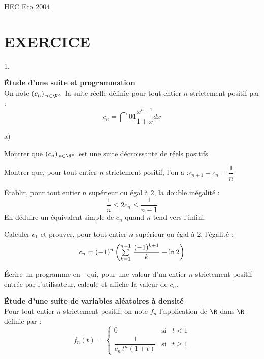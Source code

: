 \documentclass[11pt]{article}%
\begin{document}
\begin{center}
{\huge HEC Eco 2004}
\end{center}


\section*{EXERCICE}

\begin{noliste}{1.}
 \setlength{\itemsep}{4mm}
\item \textbf{Étude d'une suite et programmation}\\
On note $(c_{n})_{\,n\in \N^{\times }}$ la suite réelle définie pour
tout entier $n$ strictement positif par : 
\[
c_{n} = \dint{0}{1}\frac{x^{n-1}}{1 + x}dx
\]

\begin{noliste}{a)}
 \setlength{\itemsep}{2mm}
\item Montrer que $(c_{n})_{\,n\in \N^{\times }}$ est une suite
décroissante de réels positifs.

\item Montrer que, pour tout entier $n$ strictement positif, l'on a
:\quad $c_{n + 1} + c_{n} = \dfrac{1}{n}$

\item Établir, pour tout entier $n$ supérieur ou égal à $2$, la double
inégalité :
\[
\dfrac{1}{n}\leq 2c_{n}\leq \dfrac{1}{n-1}
\]
En déduire un équivalent simple de $c_{n}$ quand $n$ tend vers
l'infini.

\item Calculer $c_{1}$ et prouver, pour tout entier $n$ supérieur ou
égal à $2$, l'égalité :
\[
c_{n} = (-1)^{n}\left( {\textstyle\sum\limits_{k = 1}^{n-1}}\hspace{.1cm}\dfrac{(-1)^{k + 1}}{k}-\ln
2\right)
\]

\item Écrire un programme en -\Scilab{} qui, pour une valeur d'un
entier $n $ strictement positif entrée par l'utilisateur, calcule et
affiche la
valeur de $c_{n}$.
\end{noliste}

\item \textbf{Étude d'une suite de variables aléatoires à densité}\\
Pour tout entier $n$ strictement positif, on note $f_{n}$ l'application
de $\R$ dans $\R$ définie par : 
\[
f_{n}(t) = \left\{ 
\begin{matrix}
0 & \text{si} & t<1 \\
\dfrac{1}{c_{n}\,t^{n}(1 + t)} & \text{si} & t\geq 1\end{matrix}\right.
\]


\end{noliste}
\end{document}
